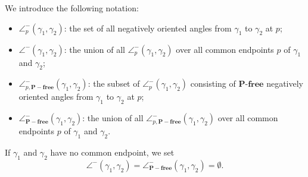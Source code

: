\documentclass[a4paper,10pt]{amsart}
\theoremstyle{plain}          %
\theoremstyle{definition}
\def\ba{\mathbf{a}}
\def\PP{\mathbf{P}}
\newcommand{\apfree}{\angle^-_{\mathbf{P-free}}}
\newcommand{\appfree}{\angle^-_{p,\mathbf{P-free}}}
\newcommand{\ie}{{\em i.e.}\ }
\begin{document}
We introduce the following notation:
\begin{itemize}
    \item $\angle^{-}_p(\gamma_1,\gamma_2)$: the set of all negatively oriented angles from $\gamma_1$ to $\gamma_2$ at $p$;
    \item $\angle^{-}(\gamma_1,\gamma_2)$: the union of all $\angle^{-}_p(\gamma_1,\gamma_2)$ over all common endpoints $p$ of $\gamma_1$ and $\gamma_2$;
    \item $\appfree(\gamma_1,\gamma_2)$: the subset of $\angle^{-}_p(\gamma_1,\gamma_2)$ consisting of $\mathbf{P}$-$\mathbf{free}$ negatively oriented angles from $\gamma_1$ to $\gamma_2$ at $p$; 
    \item $\apfree(\gamma_1,\gamma_2)$: the union of all $\appfree(\gamma_1,\gamma_2)$ over all common endpoints $p$ of $\gamma_1$ and $\gamma_2$.
\end{itemize}
If $\gamma_1$ and $\gamma_2$ have no common endpoint, we set $$\angle^{-}(\gamma_1,\gamma_2)=\apfree(\gamma_1,\gamma_2)=\emptyset.$$
\end{document}
